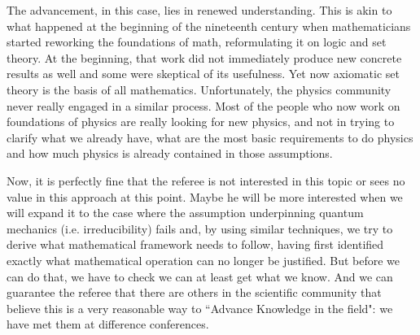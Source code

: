 \documentclass[10pt]{article}
\begin{document}
\begin{response}
The advancement, in this case, lies in renewed understanding. This is akin to what happened at the beginning of the nineteenth century when mathematicians started reworking the foundations of math, reformulating it on logic and set theory. At the beginning, that work did not immediately produce new concrete results as well and some were skeptical of its usefulness. Yet now axiomatic set theory is the basis of all mathematics. Unfortunately, the physics community never really engaged in a similar process. Most of the people who now work on foundations of physics are really looking for new physics, and not in trying to clarify what we already have, what are the most basic requirements to do physics and how much physics is already contained in those assumptions.

Now, it is perfectly fine that the referee is not interested in this topic or sees no value in this approach at this point. Maybe he will be more interested when we will expand it to the case where the assumption underpinning quantum mechanics (i.e. irreducibility) fails and, by using similar techniques, we try to derive what mathematical framework needs to follow, having first identified exactly what mathematical operation can no longer be justified. But before we can do that, we have to check we can at least get what we know. And we can guarantee the referee that there are others in the scientific community that believe this is a very reasonable way to ``Advance Knowledge in the field": we have met them at difference conferences. 

\end{response}
\end{document}

